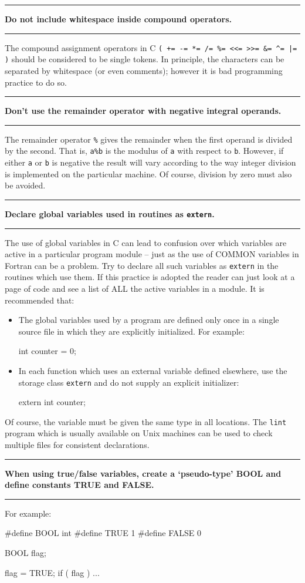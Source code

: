 \documentclass[twoside,11pt,nolof,noabs]{starlink}
\newcounter{sruleno}
\newcommand{\srule}[1]{
    \addtocounter{sruleno}{1}
    \goodbreak
    \rule{\textwidth}{0.3mm}
    \textbf{#1} \scpushright{\textbf{\thesruleno}}
    \rule{\textwidth}{0.1mm}
}
\begin{document}
\srule{Do not include whitespace inside compound operators.}
The compound assignment operators in C
\verb~( += -= *= /= %= <<= >>= &= ^= |= )~
should be considered to be single tokens. In principle, the characters can
be separated by whitespace (or even comments); however it is bad programming
practice to do so.

\srule{Don't use the remainder operator with negative integral operands.}
The remainder operator \verb~%~ gives the remainder when the first operand is
divided by the second. That is, \texttt{a\%b} is the modulus of \texttt{a}
with respect to \texttt{b}.
However, if either \texttt{a} or \texttt{b} is negative the result will vary according to the
way integer division is implemented on the particular machine.
Of course, division by zero must also be avoided.


\srule{Declare global variables used in routines as \texttt{extern}.}
The use of global variables in C can lead to confusion over which
variables are active in a particular program module --
just as the use of COMMON variables in Fortran can be a problem.
Try to declare  all such variables as \texttt{extern} in the routines which
use them.
If this practice is adopted the reader can just look at a page of code
and see a list of ALL the active variables in a module.
It is recommended that:
\begin{itemize}
\item The global variables used by a program are defined only once
in a single source file  in which they are explicitly initialized.
For example:
\begin{terminalv}
      int counter = 0;
\end{terminalv}
\item In each function which uses an external variable defined elsewhere,
 use the storage class \texttt{extern} and do not supply
an explicit initializer:
\begin{terminalv}
      extern int counter;
\end{terminalv}
\end{itemize}
Of course, the variable must be given the same type in all
locations.
The \texttt{lint} program which is usually available on Unix machines can be
used to check multiple files for consistent declarations.

\srule{When using true/false variables, create a `pseudo-type' BOOL and define
  constants TRUE and FALSE.}
For example:
\begin{terminalv}
      #define BOOL int
      #define TRUE 1
      #define FALSE 0

      BOOL flag;

      flag = TRUE;
      if ( flag )
      ...
\end{terminalv}
\end{document}
